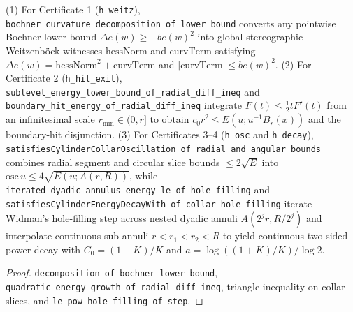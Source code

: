\begin{theorem}
\label{n3_phase2_bridges}
\leanok
{}
(1) For Certificate 1 (\texttt{h\_weitz}), \texttt{bochner\_curvature\_decomposition\_of\_lower\_bound}
converts any pointwise Bochner lower bound $\Delta e(w)\ge -be(w)^2$ into global stereographic
Weitzenb\"ock witnesses $\mathrm{hessNorm}$ and $\mathrm{curvTerm}$ satisfying
$\Delta e(w)=\mathrm{hessNorm}^2+\mathrm{curvTerm}$ and $|\mathrm{curvTerm}|\le be(w)^2$.
(2) For Certificate 2 (\texttt{h\_hit\_exit}), \texttt{sublevel\_energy\_lower\_bound\_of\_radial\_diff\_ineq}
and \texttt{boundary\_hit\_energy\_of\_radial\_diff\_ineq} integrate $F(t)\le\tfrac12 tF'(t)$ from an
infinitesimal scale $r_{\min}\in(0,r]$ to obtain $c_0 r^2\le E(u;u^{-1}B_r(x))$ and the boundary-hit
disjunction.
(3) For Certificates 3--4 (\texttt{h\_osc} and \texttt{h\_decay}),
\texttt{satisfiesCylinderCollarOscillation\_of\_radial\_and\_angular\_bounds} combines radial segment and
circular slice bounds $\le 2\sqrt{E}$ into $\mathrm{osc}\,u\le 4\sqrt{E(u;A(r,R))}$, while
\texttt{iterated\_dyadic\_annulus\_energy\_le\_of\_hole\_filling} and
\texttt{satisfiesCylinderEnergyDecayWith\_of\_collar\_hole\_filling} iterate Widman's hole-filling step
across nested dyadic annuli $A(2^j r, R/2^j)$ and interpolate continuous sub-annuli $r<r_1<r_2<R$ to yield
continuous two-sided power decay with $C_0=(1+K)/K$ and $a=\log((1+K)/K)/\log 2$.
\end{theorem}
\begin{proof}\leanok \texttt{decomposition\_of\_bochner\_lower\_bound}, \texttt{quadratic\_energy\_growth\_of\_radial\_diff\_ineq},
triangle inequality on collar slices, and \texttt{le\_pow\_hole\_filling\_of\_step}.\end{proof}

